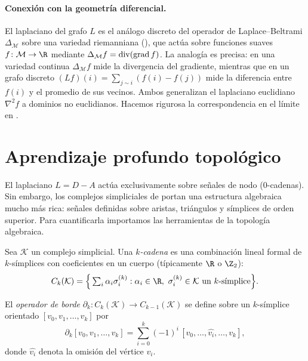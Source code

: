\paragraph{Conexi\'on con la geometr\'ia diferencial.}
El laplaciano del grafo $L$ es el an\'alogo discreto del operador de
Laplace--Beltrami $\Delta_{\mathcal{M}}$ sobre una variedad riemanniana
(), que act\'ua sobre funciones suaves
$f \colon \mathcal{M} \to \R$ mediante $\Delta_{\mathcal{M}} f = \operatorname{div}(\operatorname{grad} f)$.
La analog\'ia es precisa: en una variedad continua $\Delta_{\mathcal{M}} f$ mide
la divergencia del gradiente, mientras que en un grafo discreto
$(L f)(i) = \sum_{j \sim i} (f(i) - f(j))$ mide la diferencia entre $f(i)$ y el
promedio de sus vecinos. Ambos generalizan el laplaciano euclidiano $\nabla^2 f$
a dominios no euclidianos. Hacemos rigurosa la correspondencia en el l\'imite en
.

\section{Aprendizaje profundo topol\'ogico}
\label{sec:graphs:tdl}

El laplaciano $L = D - A$ act\'ua exclusivamente sobre se\~nales de nodo
($0$-cadenas). Sin embargo, los complejos simpliciales de
 portan una estructura algebraica mucho m\'as rica:
se\~nales definidas sobre aristas, tri\'angulos y s\'implices de orden superior.
Para cuantificarla importamos las herramientas de la topolog\'ia algebraica.

\begin{definition}[Cadenas]
\label{def:graphs:chains}
Sea $\mathcal{K}$ un complejo simplicial. Una \emph{$k$-cadena} es una
combinaci\'on lineal formal de $k$-s\'implices con coeficientes en un cuerpo
(t\'ipicamente $\R$ o $\Z_2$):
\[
  C_k(\mathcal{K}) = \Big\{ \textstyle\sum_i \alpha_i \sigma_i^{(k)}
    : \alpha_i \in \R,\ \sigma_i^{(k)} \in \mathcal{K} \text{ un $k$-s\'implice} \Big\}.
\]
\end{definition}

\begin{definition}
\label{def:graphs:boundary}
El \emph{operador de borde}
$\partial_k \colon C_k(\mathcal{K}) \to C_{k-1}(\mathcal{K})$ se define sobre un
$k$-s\'implice orientado $[v_0, v_1, \dots, v_k]$ por
\[
  \partial_k [v_0, v_1, \dots, v_k]
    = \sum_{i=0}^{k} (-1)^i\, [v_0, \dots, \widehat{v_i}, \dots, v_k],
\]
donde $\widehat{v_i}$ denota la omisi\'on del v\'ertice $v_i$.
\end{definition}

